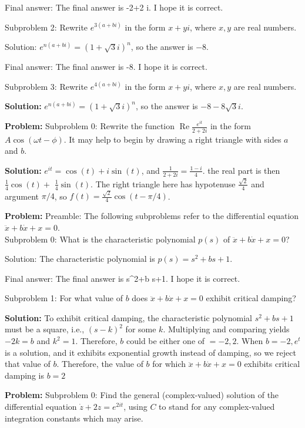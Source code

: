 \documentclass[10pt]{article}
\begin{document}
Final answer: The final answer is -2+2  i. I hope it is correct.

Subproblem 2: Rewrite $e^{3(a+b i)}$ in the form $x + yi$, where $x, y$ are real numbers. 


Solution: $e^{n(a+b i)}=(1+\sqrt{3} i)^{n}$, so the answer is $\boxed{-8}$.

Final answer: The final answer is -8. I hope it is correct.

Subproblem 3: Rewrite $e^{4(a+b i)}$ in the form $x + yi$, where $x, y$ are real numbers. 


\textbf{Solution:}
 $e^{n(a+b i)}=(1+\sqrt{3} i)^{n}$, so the answer is $\boxed{-8-8 \sqrt{3} i}$.


\textbf{Problem:}
Subproblem 0: Rewrite the function $\operatorname{Re} \frac{e^{i t}}{2+2 i}$ in the form $A \cos (\omega t-\phi)$. It may help to begin by drawing a right triangle with sides $a$ and $b$. 


\textbf{Solution:}
$e^{i t}=\cos (t)+i \sin (t)$, and $\frac{1}{2+2 i}=\frac{1-i}{4}$. the real part is then $\frac{1}{4} \cos (t)+$ $\frac{1}{4} \sin (t)$. The right triangle here has hypotenuse $\frac{\sqrt{2}}{4}$ and argument $\pi / 4$, so $f(t)=\boxed{\frac{\sqrt{2}}{4} \cos (t-\pi / 4)}$.


\textbf{Problem:}
Preamble: The following subproblems refer to the differential equation $\ddot{x}+b \dot{x}+x=0$.\\

Subproblem 0: What is the characteristic polynomial $p(s)$ of $\ddot{x}+b \dot{x}+x=0$?


Solution: The characteristic polynomial is $p(s)=\boxed{s^{2}+b s+1}$.

Final answer: The final answer is s^{2}+b s+1. I hope it is correct.

Subproblem 1: For what value of $b$ does $\ddot{x}+b \dot{x}+x=0$ exhibit critical damping?


\textbf{Solution:}
To exhibit critical damping, the characteristic polynomial $s^{2}+b s+1$ must be a square, i.e., $(s-k)^{2}$ for some $k$. Multiplying and comparing yields $-2 k=b$ and $k^{2}=1$. Therefore, $b$ could be either one of $=-2, 2$. When $b=-2, e^{t}$ is a solution, and it exhibits exponential growth instead of damping, so we reject that value of $b$. Therefore, the value of $b$ for which $\ddot{x}+b \dot{x}+x=0$ exhibits critical damping is $b=\boxed{2}$


\textbf{Problem:}
Subproblem 0: Find the general (complex-valued) solution of the differential equation $\dot{z}+2 z=e^{2 i t}$, using $C$ to stand for any complex-valued integration constants which may arise.
\end{document}
